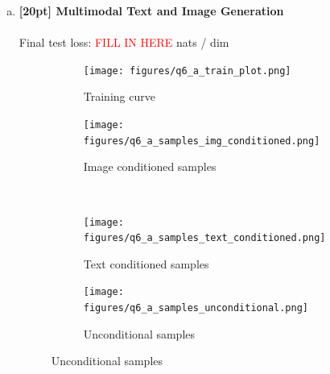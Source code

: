 \documentclass{article}
\begin{document}
\begin{enumerate}[(a)]
\item {\bf [20pt] Multimodal Text and Image Generation} \\\\
Final test loss: \textcolor{red}{FILL IN HERE}  nats / dim
\begin{figure}[H]
    \centering
    \begin{subfigure}{0.45\textwidth}
        \centering
        \texttt{[image: figures/q6\_a\_train\_plot.png]}
        \caption{Training curve}
    \end{subfigure}
    \hspace{0.2in}
    \begin{subfigure}{0.45\textwidth}
        \centering
        \texttt{[image: figures/q6\_a\_samples\_img\_conditioned.png]}
        \caption{Image conditioned samples}
    \end{subfigure} \\
    \begin{subfigure}{0.45\textwidth}
        \centering
        \texttt{[image: figures/q6\_a\_samples\_text\_conditioned.png]}
        \caption{Text conditioned samples}
    \end{subfigure}
    \hspace{0.2in}
    \begin{subfigure}{0.45\textwidth}
        \centering
        \texttt{[image: figures/q6\_a\_samples\_unconditional.png]}
        \caption{Unconditional samples}
    \end{subfigure}
\end{figure}

\end{enumerate}
\end{document}
